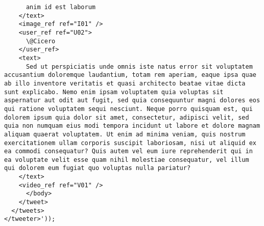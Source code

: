 \begin{verbatim}
	  anim id est laborum
	</text>
	<image_ref ref="I01" />
	<user_ref ref="U02">
	  \@Cicero
	</user_ref>
	<text>
	  Sed ut perspiciatis unde omnis iste natus error sit voluptatem accusantium doloremque laudantium, totam rem aperiam, eaque ipsa quae ab illo inventore veritatis et quasi architecto beatae vitae dicta sunt explicabo. Nemo enim ipsam voluptatem quia voluptas sit aspernatur aut odit aut fugit, sed quia consequuntur magni dolores eos qui ratione voluptatem sequi nesciunt. Neque porro quisquam est, qui dolorem ipsum quia dolor sit amet, consectetur, adipisci velit, sed quia non numquam eius modi tempora incidunt ut labore et dolore magnam aliquam quaerat voluptatem. Ut enim ad minima veniam, quis nostrum exercitationem ullam corporis suscipit laboriosam, nisi ut aliquid ex ea commodi consequatur? Quis autem vel eum iure reprehenderit qui in ea voluptate velit esse quam nihil molestiae consequatur, vel illum qui dolorem eum fugiat quo voluptas nulla pariatur?
	</text>
	<video_ref ref="V01" />
      </body>
    </tweet>
  </tweets>
</tweeter>'));
\end{verbatim}

